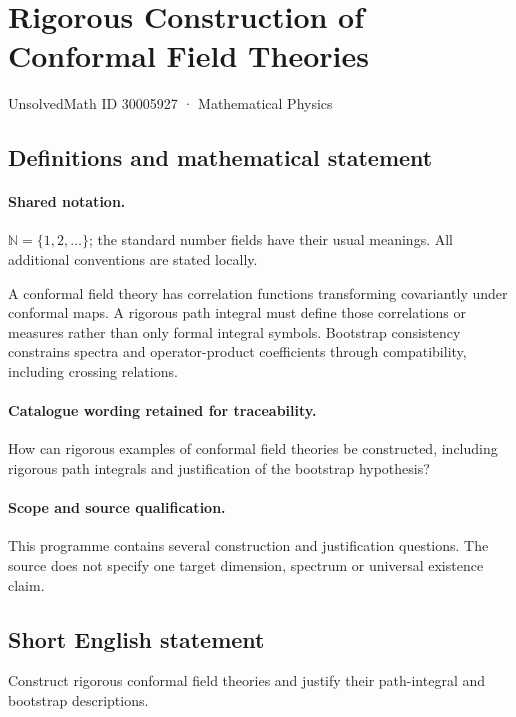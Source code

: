 \documentclass[11pt]{article}
\begin{document}
\setcounter{section}{30005926}
\section{Rigorous Construction of Conformal Field Theories}\label{30005927}
{\small UnsolvedMath ID 30005927 · Mathematical Physics}
\subsection{Definitions and mathematical statement}

\paragraph{Shared notation.}$\mathbb N=\{1,2,\ldots\}$; the standard number fields have their usual meanings. All additional conventions are stated locally.


A conformal field theory has correlation functions transforming covariantly under conformal maps. A rigorous path integral must define those correlations or measures rather than only formal integral symbols. Bootstrap consistency constrains spectra and operator-product coefficients through compatibility, including crossing relations.

\paragraph{Catalogue wording retained for traceability.}
How can rigorous examples of conformal field theories be constructed, including rigorous path integrals and justification of the bootstrap hypothesis?

\paragraph{Scope and source qualification.}This programme contains several construction and justification questions. The source does not specify one target dimension, spectrum or universal existence claim.
\subsection{Short English statement}
Construct rigorous conformal field theories and justify their path-integral and bootstrap descriptions.
\end{document}
